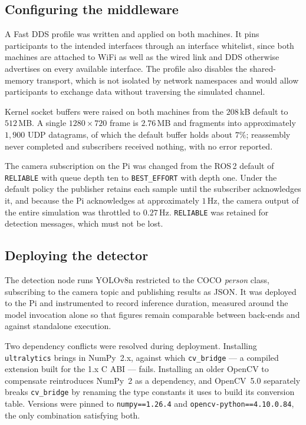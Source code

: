 \subsection{Configuring the middleware}
\label{sec:hitl-dds}

A Fast DDS profile was written and applied on both machines. It pins participants
to the intended interfaces through an interface whitelist, since both machines
are attached to WiFi as well as the wired link and DDS otherwise advertises on
every available interface. The profile also disables the shared-memory transport,
which is not isolated by network namespaces and would allow participants to
exchange data without traversing the simulated channel.

Kernel socket buffers were raised on both machines from the \(208\)\,kB default
to \(512\)\,MB. A single \(1280 \times 720\) frame is \(2.76\)\,MB and fragments
into approximately \(1{,}900\) UDP datagrams, of which the default buffer holds
about \(7\%\); reassembly never completed and subscribers received nothing, with
no error reported.

The camera subscription on the Pi was changed from the ROS\,2 default of
\texttt{RELIABLE} with queue depth ten to \texttt{BEST\_EFFORT} with depth one.
Under the default policy the publisher retains each sample until the subscriber
acknowledges it, and because the Pi acknowledges at approximately \(1\)\,Hz, the
camera output of the entire simulation was throttled to \(0.27\)\,Hz.
\texttt{RELIABLE} was retained for detection messages, which must not be lost.

\subsection{Deploying the detector}
\label{sec:hitl-detector}

The detection node runs YOLOv8n restricted to the COCO \emph{person} class,
subscribing to the camera topic and publishing results as JSON. It was deployed
to the Pi and instrumented to record inference duration, measured around the
model invocation alone so that figures remain comparable between back-ends and
against standalone execution.

Two dependency conflicts were resolved during deployment. Installing
\texttt{ultralytics} brings in NumPy~2.x, against which \texttt{cv\_bridge} --- a
compiled extension built for the 1.x C ABI --- fails. Installing an older OpenCV
to compensate reintroduces NumPy~2 as a dependency, and OpenCV~5.0 separately
breaks \texttt{cv\_bridge} by renaming the type constants it uses to build its
conversion table. Versions were pinned to \texttt{numpy==1.26.4} and
\texttt{opencv-python==4.10.0.84}, the only combination satisfying both.

